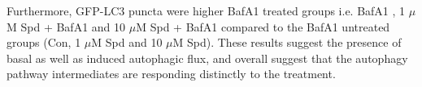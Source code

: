 Furthermore, GFP-LC3 puncta were higher BafA1 treated groups i.e. BafA1 , 1 $\mu$M Spd + BafA1 and 10 $\mu$M Spd + BafA1 compared to the BafA1 untreated groups (Con, 1 $\mu$M Spd and 10 $\mu$M Spd). These results suggest the presence of basal as well as induced autophagic flux, and overall suggest that the autophagy pathway intermediates are responding distinctly to the treatment.




















